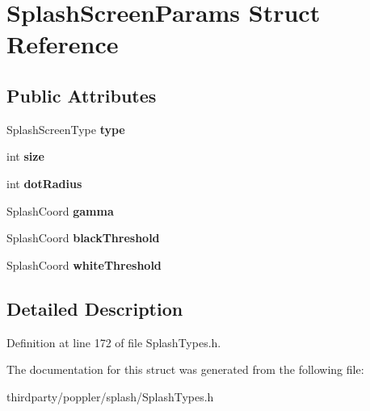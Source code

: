 \hypertarget{struct_splash_screen_params}{}\section{Splash\+Screen\+Params Struct Reference}
\label{struct_splash_screen_params}
\subsection*{Public Attributes}
\begin{DoxyCompactItemize}
\item 
\mbox{\label{struct_splash_screen_params_a0078f2623cec2efb23c262c2bf6cf08c}} 
Splash\+Screen\+Type {\bfseries type}
\item 
\mbox{\label{struct_splash_screen_params_a7294ccb2cbb2a10016c678ef1b75a5a7}} 
int {\bfseries size}
\item 
\mbox{\label{struct_splash_screen_params_ac7a9fee4d2646de4bc666af4919d9bbb}} 
int {\bfseries dot\+Radius}
\item 
\mbox{\label{struct_splash_screen_params_a314c6f553261c8649a11f991c373c0fc}} 
Splash\+Coord {\bfseries gamma}
\item 
\mbox{\label{struct_splash_screen_params_ab9e423a62f402e6c7238594964e90b43}} 
Splash\+Coord {\bfseries black\+Threshold}
\item 
\mbox{\label{struct_splash_screen_params_a5271c7d821c7cfce4b245ef62335d3d9}} 
Splash\+Coord {\bfseries white\+Threshold}
\end{DoxyCompactItemize}


\subsection{Detailed Description}


Definition at line 172 of file Splash\+Types.\+h.



The documentation for this struct was generated from the following file\+:\begin{DoxyCompactItemize}
\item 
thirdparty/poppler/splash/Splash\+Types.\+h\end{DoxyCompactItemize}
